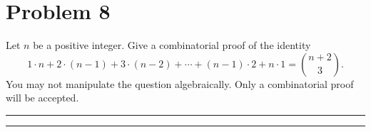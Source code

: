 \documentclass{article}
\theoremstyle{definition}
\newenvironment{solution}{\bigskip\hrule{\hfill}}{\bigskip\hrule{\hfill}} %
\begin{document}

\newpage


\section*{Problem 8}
Let $n$ be a positive integer. Give a combinatorial proof of the identity $$1\cdot n+2\cdot\left(n-1\right)+3\cdot\left(n-2\right)+\cdots+\left(n-1\right)\cdot2+n\cdot1=\binom{n+2}{3}.$$ You may not manipulate the question algebraically. Only a combinatorial proof will be accepted.
\begin{solution}


\end{solution}

\end{document}
